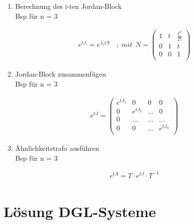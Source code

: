 \documentclass[10pt,a4paper]{article}
\begin{document}
\begin{enumerate}[(1)]
    \item Berechnung des i-ten Jordan-Block\\
        Bsp für n = 3
  \begin{mdframed}[style=exercise]
    \begin{align}
        e^{tJ_i} = e^{\lambda_i t N} \ \ \ \ ; \ mit \ \ 
        N = \begin{pmatrix}
            1 & t & \frac{t^2}{2!} \\
            0 & 1 &  t \\
            0 & 0 &  1 \\
        \end{pmatrix}
    \end{align}
  \end{mdframed}

    \item Jordan-Block zusammenfügen\\
        Bsp für n = 3
  \begin{mdframed}[style=exercise]
    \begin{align}
        e^{tJ} =
        \begin{pmatrix}
            e^{tJ_1} & 0 & 0 & 0 \\
            0 & e^{tJ_2} & ... & 0 \\
            0 &  ...  & ... &  ... \\
            0 & 0 & ... & e^{tJ_n} \\
        \end{pmatrix}
    \end{align}
  \end{mdframed}

    \item Ähnlichkeitstrafo ausführen\\
        Bsp für n = 3
  \begin{mdframed}[style=exercise]
    \begin{align}
        e^{tA} = T \cdot e^{tJ} \cdot T^{-1} \\
    \end{align}
  \end{mdframed}
\end{enumerate}

\newpage
\section{Lösung DGL-Systeme}
\end{document}
